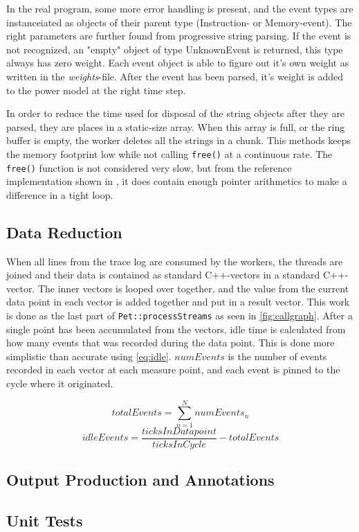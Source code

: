 In the real program, some more error handling is present, and the event types
are instanceiated as objects of their parent type (Instruction- or
Memory-event). The right parameters are further found from progressive string
parsing. If the event is not recognized, an "empty" object of type UnknownEvent
is returned, this type always has zero weight. Each event object is able to
figure out it's own weight as written in the \emph{weights}-file. After the
event has been parsed, it's weight is added to the power model at the right
time step.

In order to reduce the time used for disposal of the string objects
after they are parsed, they are places in a static-size array. When
this array is full, or the ring buffer is empty, the worker deletes
all the strings in a chunk. This methods keeps the memory footprint
low while not calling \texttt{free()} at a continuous rate. The \texttt{free()}
function is not considered very slow, but from the reference implementation
shown in \cite{kernighan1988c}, it does contain enough pointer
arithmetics to make a difference in a tight loop.

\subsection{Data Reduction}

When all lines from the trace log are consumed by the workers, the threads are
joined and their data is contained as standard C++-vectors in a standard
C++-vector. The inner vectors is looped over together, and the value from the
current data point in each vector is added together and put in a result vector.
This work is done as the last part of \texttt{Pet::processStreams} as seen in
\autoref{fig:callgraph}. After a single point has been accumulated from the
vectors, idle time is calculated from how many events that was recorded during
the data point. This is done more simplistic than accurate using
\autoref{eq:idle}. $numEvents$ is the number of events recorded in each vector
at each measure point, and each event is pinned to the cycle where it
originated.

\begin{equation}
    totalEvents = \sum_{n=1}^{N} numEvents_n
\end{equation}
\begin{equation}
    idleEvents = \frac{ticksInDatapoint}{ticksInCycle}- totalEvents
\label{eq:idle}
\end{equation}



\subsection{Output Production and Annotations}



\subsection{Unit Tests}


